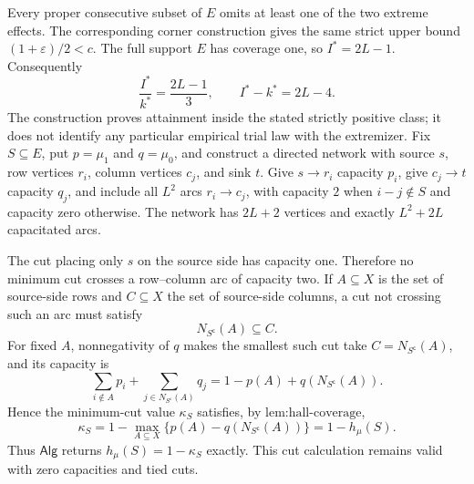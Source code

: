 Every proper consecutive subset of \(E\) omits at least one of the two extreme effects.  The corresponding corner construction gives the same strict upper bound \((1+\varepsilon)/2<c\).  The full support \(E\) has coverage one, so \(I^*=2L-1\).  Consequently
\[
\frac{I^*}{k^*}=\frac{2L-1}{3},
\qquad
I^*-k^*=2L-4.
\]
The construction proves attainment inside the stated strictly positive class; it does not identify any particular empirical trial law with the extremizer.
Fix \(S\subseteq E\), put \(p=\mu_1\) and \(q=\mu_0\), and construct a directed network with source \(s\), row vertices \(r_i\), column vertices \(c_j\), and sink \(t\).  Give \(s\to r_i\) capacity \(p_i\), give \(c_j\to t\) capacity \(q_j\), and include all \(L^2\) arcs \(r_i\to c_j\), with capacity \(2\) when \(i-j\notin S\) and capacity zero otherwise.  The network has \(2L+2\) vertices and exactly \(L^2+2L\) capacitated arcs.

The cut placing only \(s\) on the source side has capacity one.  Therefore no minimum cut crosses a row--column arc of capacity two.  If \(A\subseteq X\) is the set of source-side rows and \(C\subseteq X\) the set of source-side columns, a cut not crossing such an arc must satisfy
\[
N_{S^{\mathsf c}}(A)\subseteq C.
\]
For fixed \(A\), nonnegativity of \(q\) makes the smallest such cut take \(C=N_{S^{\mathsf c}}(A)\), and its capacity is
\[
\sum_{i\notin A}p_i+\sum_{j\in N_{S^{\mathsf c}}(A)}q_j
=1-p(A)+q(N_{S^{\mathsf c}}(A)).
\]
Hence the minimum-cut value \(\kappa_S\) satisfies, by \(\text{lem:hall-coverage}\),
\[
\kappa_S
=1-\max_{A\subseteq X}\{p(A)-q(N_{S^{\mathsf c}}(A))\}
=1-h_{\mu}(S).
\]
Thus \(\mathsf{Alg}\) returns \(h_{\mu}(S)=1-\kappa_S\) exactly.  This cut calculation remains valid with zero capacities and tied cuts.

